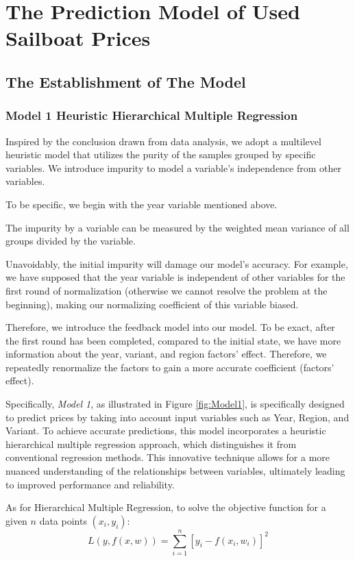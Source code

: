 \documentclass[12pt]{article}  %
\begin{document}
\section{The Prediction Model of Used Sailboat Prices}

\subsection{The Establishment of The Model}
\subsubsection{Model 1 \textemdash  Heuristic Hierarchical Multiple Regression}
Inspired by the conclusion drawn from data analysis, we adopt a multilevel heuristic model that utilizes the purity of the samples grouped by specific variables.  We introduce impurity to model a variable's independence from other variables.

To be specific, we begin with the year variable mentioned above.

The impurity by a variable can be measured by the weighted mean variance of all groups divided by the variable.

Unavoidably, the initial impurity will damage our model's accuracy. For example, we have supposed that the year variable is independent of other variables for the first round of normalization (otherwise we cannot resolve the problem at the beginning), making our normalizing coefficient of this variable biased.

Therefore, we introduce the feedback model into our model. To be exact,   after the first round has been completed, compared to the initial state, we have more information about the year, variant, and region factors' effect. Therefore, we repeatedly renormalize the factors to gain a more accurate coefficient (factors' effect).

Specifically, \emph{Model 1}, as illustrated in Figure \ref{fig:Model1}, is specifically designed to predict prices by taking into account input variables such as Year, Region, and Variant. To achieve accurate predictions, this model incorporates a heuristic hierarchical multiple regression approach, which distinguishes it from conventional regression methods. This innovative technique allows for a more nuanced understanding of the relationships between variables, ultimately leading to improved performance and reliability.

As for Hierarchical Multiple Regression, to solve the objective function for a given $n$ data points $(x_i, y_i)$:
$$L(y,f(x,w))=\sum_{i=1}^{n}[y_i-f(x_i,w_i)]^2$$
\end{document}
